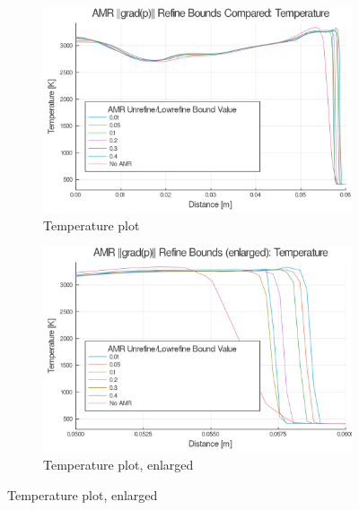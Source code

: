 \begin{figure} \ContinuedFloat

    \centering
    \begin{subfigure}[]{\textwidth}
        \centering
        \includegraphics[width=\textwidth]{./figs/amrfigs/amr_refinebounds/t.png}
        \caption{Temperature plot}
    \end{subfigure}

    \centering
    \begin{subfigure}[]{\textwidth}
        \centering
        \includegraphics[width=\textwidth]{./figs/amrfigs/amr_refinebounds/te.png}
        \caption{Temperature plot, enlarged}
    \end{subfigure}

\end{figure}
